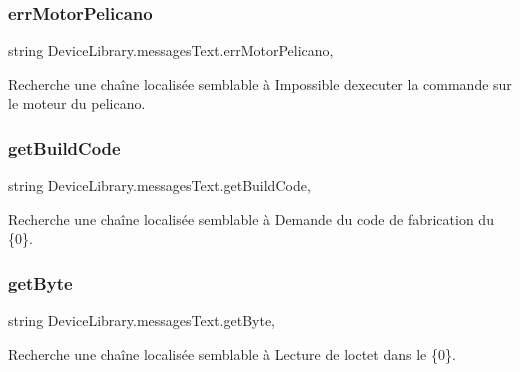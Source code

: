 \subsubsection{\texorpdfstring{err\+Motor\+Pelicano}{errMotorPelicano}}
{\footnotesize\ttfamily string Device\+Library.\+messages\+Text.\+err\+Motor\+Pelicano\hspace{0.3cm}{\ttfamily [static]}, {\ttfamily [get]}}



Recherche une chaîne localisée semblable à Impossible d\textquotesingle{}executer la commande sur le moteur du pelicano. 

\mbox{\label{class_device_library_1_1messages_text_a2ff352411ad8af876fe7fb650e091aa5}} 
\subsubsection{\texorpdfstring{get\+Build\+Code}{getBuildCode}}
{\footnotesize\ttfamily string Device\+Library.\+messages\+Text.\+get\+Build\+Code\hspace{0.3cm}{\ttfamily [static]}, {\ttfamily [get]}}



Recherche une chaîne localisée semblable à Demande du code de fabrication du \{0\}. 

\mbox{\label{class_device_library_1_1messages_text_a76120e98024c293607801a782c164899}} 
\subsubsection{\texorpdfstring{get\+Byte}{getByte}}
{\footnotesize\ttfamily string Device\+Library.\+messages\+Text.\+get\+Byte\hspace{0.3cm}{\ttfamily [static]}, {\ttfamily [get]}}



Recherche une chaîne localisée semblable à Lecture de l\textquotesingle{}octet dans le \{0\}. 

